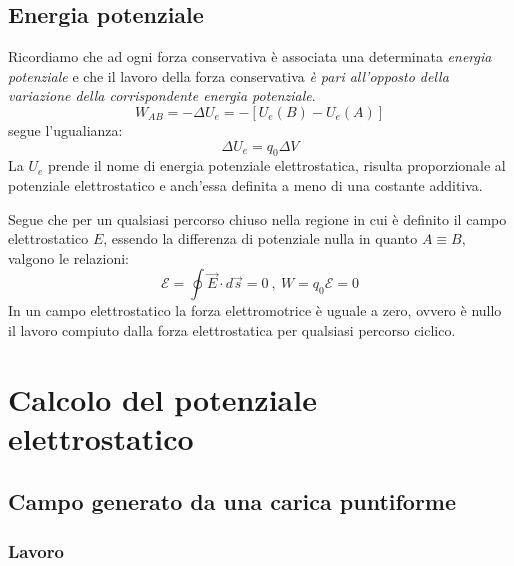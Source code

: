 \documentclass[class=book, crop=false, oneside, 12pt]{standalone}
\begin{document}
\subsection*{Energia potenziale}

Ricordiamo che ad ogni forza conservativa è associata una determinata \emph{energia potenziale} e che il lavoro della forza  conservativa \emph{è pari all'opposto della variazione della corrispondente energia potenziale}.
\begin{equation*}
    W_{AB} = - \Delta U_e = - \left[U_e (B) - U_e (A)\right]
\end{equation*}
segue l'ugualianza:
\begin{equation}
    \Delta U_e = q_0 \Delta V
\end{equation}
La \(U_e\) prende il nome di energia potenziale elettrostatica, risulta proporzionale al potenziale elettrostatico e anch'essa definita a meno di una costante additiva. 

Segue che per un qualsiasi percorso chiuso nella regione in cui è definito il campo elettrostatico \(E\), essendo la differenza di potenziale nulla in quanto \(A \equiv B\), valgono le relazioni:
\begin{equation}
    \mathcal{E} = \oint \overrightarrow{E} \cdot d \overrightarrow{s} = 0 \ , \ W = q_0 \mathcal{E} = 0
\end{equation}
In un campo elettrostatico la forza elettromotrice è uguale a zero, ovvero è nullo il lavoro compiuto dalla forza elettrostatica per qualsiasi percorso ciclico.

\section{Calcolo del potenziale elettrostatico}

\subsection*{Campo generato da una carica puntiforme}

\subsubsection*{Lavoro}
\end{document}
